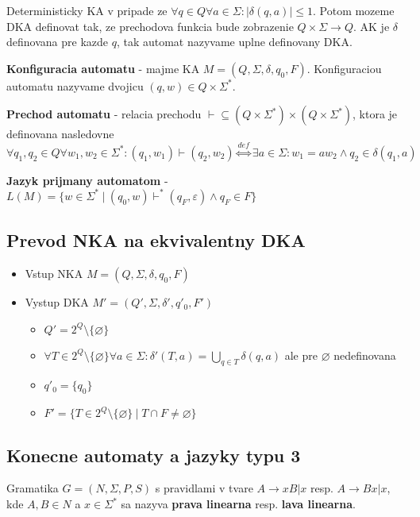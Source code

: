 \documentclass[12pt]{article}
\newcommand{\pipesep}{\hspace{3pt} \vert \hspace{3pt}}
\begin{document}
Deterministicky KA v pripade ze $\forall q \in Q \forall a \in \Sigma: |\delta(q,a)| \le 1$. Potom
mozeme DKA definovat tak, ze prechodova funkcia bude zobrazenie $Q \times \Sigma \to Q$. AK je $\delta$
definovana pre kazde $q$, tak automat nazyvame uplne definovany DKA.

\textbf{Konfiguracia automatu} - majme KA $M = (Q,\Sigma,\delta,q_{0},F)$. Konfiguraciou automatu
nazyvame dvojicu $(q, w) \in Q \times \Sigma^{*}$.

\textbf{Prechod automatu} - relacia prechodu $\vdash \subseteq (Q \times \Sigma^{*}) \times (Q \times \Sigma^{*})$,
ktora je definovana nasledovne
\begin{equation*}
	\forall q_{1}, q_{2} \in Q \forall w_{1},w_{2} \in \Sigma^{*}:
	(q_{1}, w_{1}) \vdash (q_{2}, w_{2}) \overset{def}{\Leftrightarrow} \exists a \in \Sigma: w_{1} = aw_{2} \land q_{2} \in \delta(q_{1}, a)
\end{equation*}

\textbf{Jazyk prijmany automatom} - $L(M) = \{w \in \Sigma^{*} \pipesep (q_{0}, w) \vdash^{*} (q_{F}, \varepsilon) \land q_{F} \in F\}$

\subsection*{Prevod NKA na ekvivalentny DKA}
\begin{itemize}
	\item Vstup NKA $M = (Q,\Sigma,\delta,q_{0},F)$
	\item Vystup DKA $M' = (Q',\Sigma,\delta',q'_{0},F')$
	\begin{itemize}
		\item $Q' = 2^{Q} \setminus \{\varnothing\}$
		\item $\forall T \in 2^{Q} \setminus \{\varnothing\} \forall a \in \Sigma: \delta'(T,a) = \underset{q \in T}{\bigcup}\delta(q,a)$ ale pre $\varnothing$ nedefinovana
		\item $q'_{0} = \{q_{0}\}$
		\item $F' = \{T \in 2^{Q} \setminus \{\varnothing\} \pipesep T \cap F \not= \varnothing\}$
	\end{itemize}
\end{itemize}

\subsection*{Konecne automaty a jazyky typu 3}
Gramatika $G = (N,\Sigma,P,S)$ s pravidlami v tvare $A \to xB|x$ resp. $A \to Bx|x$, kde $A,B \in N$
a $x \in \Sigma^{*}$ sa nazyva \textbf{prava linearna} resp. \textbf{lava linearna}.
\end{document}
